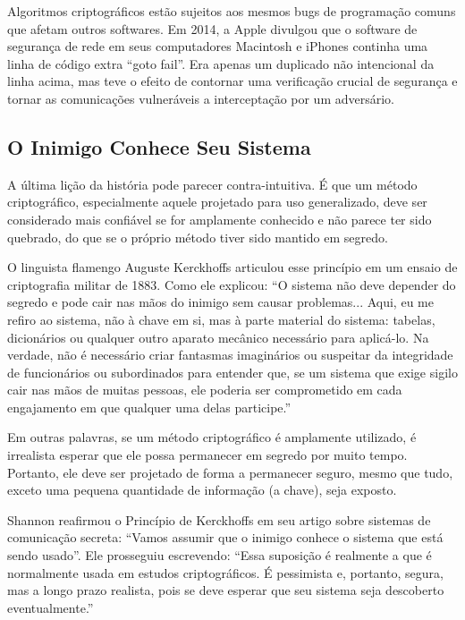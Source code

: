 \documentclass{book}
\begin{document}
Algoritmos criptográficos estão sujeitos aos mesmos bugs de programação comuns que afetam outros softwares. Em 2014, a Apple divulgou que o software de segurança de rede em seus computadores Macintosh e iPhones continha uma linha de código extra ``goto fail''. Era apenas um duplicado não intencional da linha acima, mas teve o efeito de contornar uma verificação crucial de segurança e tornar as comunicações vulneráveis a interceptação por um adversário.


\subsection{O Inimigo Conhece Seu Sistema}
\label{segredos:inimigo}

A última lição da história pode parecer contra-intuitiva. É que um método criptográfico, especialmente aquele projetado para uso generalizado, deve ser considerado mais confiável se for amplamente conhecido e não parece ter sido quebrado, do que se o próprio método tiver sido mantido em segredo.

O linguista flamengo Auguste Kerckhoffs articulou esse princípio em um ensaio de criptografia militar de 1883. Como ele explicou:
``O sistema não deve depender do segredo e pode cair nas mãos do inimigo sem causar problemas... Aqui, eu me refiro ao sistema, não à chave em si, mas à parte material do sistema: tabelas, dicionários ou qualquer outro aparato mecânico necessário para aplicá-lo. Na verdade, não é necessário criar fantasmas imaginários ou suspeitar da integridade de funcionários ou subordinados para entender que, se um sistema que exige sigilo cair nas mãos de muitas pessoas, ele poderia ser comprometido em cada engajamento em que qualquer uma delas participe.''

Em outras palavras, se um método criptográfico é amplamente utilizado, é irrealista esperar que ele possa permanecer em segredo por muito tempo. Portanto, ele deve ser projetado de forma a permanecer seguro, mesmo que tudo, exceto uma pequena quantidade de informação (a chave), seja exposto.

Shannon reafirmou o Princípio de Kerckhoffs em seu artigo sobre sistemas de comunicação secreta: ``Vamos assumir que o inimigo conhece o sistema que está sendo usado''. Ele prosseguiu escrevendo:
``Essa suposição é realmente a que é normalmente usada em estudos criptográficos. É pessimista e, portanto, segura, mas a longo prazo realista, pois se deve esperar que seu sistema seja descoberto eventualmente.''
\end{document}
